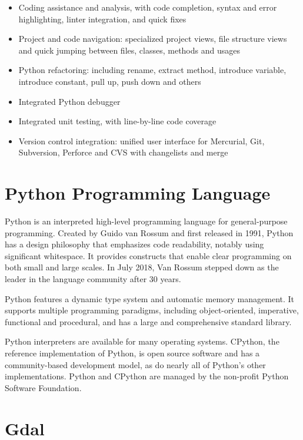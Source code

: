\documentclass[12pt, a4paper]{report}
\begin{document}
\begin{itemize}
  \item Coding assistance and analysis, with code completion, syntax and error highlighting, linter integration, and quick fixes
  \item Project and code navigation: specialized project views, file structure views and quick jumping between files, classes, methods and usages
  \item Python refactoring: including rename, extract method, introduce variable, introduce constant, pull up, push down and others
  \item Integrated Python debugger
  \item Integrated unit testing, with line-by-line code coverage
  \item Version control integration: unified user interface for Mercurial, Git, Subversion, Perforce and CVS with changelists and merge
\end{itemize}

\newpage{}

\section{Python Programming Language}

Python is an interpreted high-level programming language for general-purpose programming. Created by Guido van Rossum and first released in 1991, Python has a design philosophy that emphasizes code readability, notably using significant whitespace. It provides constructs that enable clear programming on both small and large scales. In July 2018, Van Rossum stepped down as the leader in the language community after 30 years.


Python features a dynamic type system and automatic memory management. It supports multiple programming paradigms, including object-oriented, imperative, functional and procedural, and has a large and comprehensive standard library.


Python interpreters are available for many operating systems. CPython, the reference implementation of Python, is open source software and has a community-based development model, as do nearly all of Python's other implementations. Python and CPython are managed by the non-profit Python Software Foundation. 


\newpage{}

\section{Gdal} 
\end{document}
